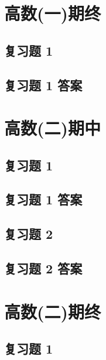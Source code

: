 


\section{高数(一)期终}
\subsection{复习题 1}
\subsection{复习题 1 答案}




\section{高数(二)期中}
\subsection{复习题 1}
\subsection{复习题 1 答案}
\subsection{复习题 2}
\subsection{复习题 2 答案}




\section{高数(二)期终}
\subsection{复习题 1}
